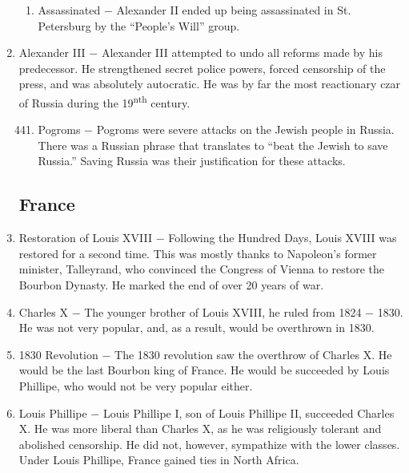 \documentclass[12pt]{article}
\begin{document}
\begin{enumerate}
\begin{enumerate}[label=\arabic{*}.]
\item Assassinated $-$ Alexander II ended up being assassinated in St. Petersburg by the ``People's Will'' group.

\end{enumerate}
\setcounter{enumi}{439}

\item Alexander III $-$ Alexander III attempted to undo all reforms made by his predecessor. He strengthened secret police powers, forced censorship of the press, and was absolutely autocratic. He was by far the most reactionary czar of Russia during the 19\textsuperscript{nth} century.


\begin{enumerate}[label=\arabic{*}.]
\setcounter{enumii}{440}

\item Pogroms $-$ Pogroms were severe attacks on the Jewish people in Russia. There was a Russian phrase that translates to ``beat the Jewish to save Russia.'' Saving Russia was their justification for these attacks.

\end{enumerate}
\setcounter{enumi}{441}

\subsection{France}

\item Restoration of Louis XVIII $-$ Following the Hundred Days, Louis XVIII  was restored for a second time. This was mostly thanks to Napoleon's former minister, Talleyrand, who convinced the Congress of Vienna to restore the Bourbon Dynasty. He marked the end of over 20 years of war.

\item Charles X $-$ The younger brother of Louis XVIII, he ruled from 1824 $-$ 1830. He was not very popular, and, as a result, would be overthrown in 1830.

\item 1830 Revolution $-$ The 1830 revolution saw the overthrow of Charles X. He would be the last Bourbon king of France. He would be succeeded by Louis Phillipe, who would not be very popular either.

\item Louis Phillipe $-$ Louis Phillipe I, son of Louis Phillipe II, succeeded Charles X. He was more liberal than Charles X, as he was religiously tolerant and abolished censorship. He did not, however, sympathize with the lower classes. Under Louis Phillipe, France gained ties in North Africa.


\end{enumerate}
\end{document}
